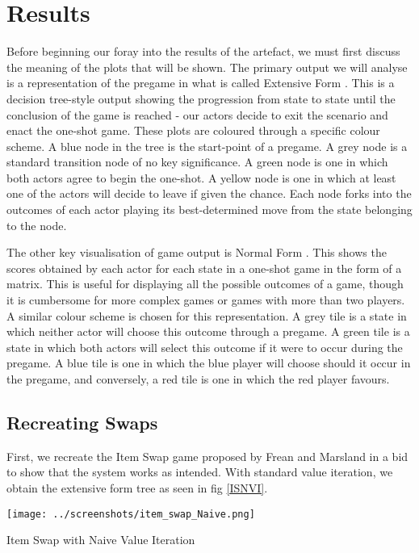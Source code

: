 \chapter{Results}\label{C:res}

Before beginning our foray into the results of the artefact, we must first discuss the meaning of the plots that will be shown. The primary output we will analyse is a representation of the pregame in what is called Extensive Form \cite{fudenberg1991game}. This is a decision tree-style output showing the progression from state to state until the conclusion of the game is reached - our actors decide to exit the scenario and enact the one-shot game. These plots are coloured through a specific colour scheme. A blue node in the tree is the start-point of a pregame. A grey node is a standard transition node of no key significance. A green node is one in which both actors agree to begin the one-shot. A yellow node is one in which at least one of the actors will decide to leave if given the chance. Each node forks into the outcomes of each actor playing its best-determined move from the state belonging to the node.

The other key visualisation of game output is Normal Form \cite{fudenberg1991game}. This shows the scores obtained by each actor for each state in a one-shot game in the form of a matrix. This is useful for displaying all the possible outcomes of a game, though it is cumbersome for more complex games or games with more than two players. A similar colour scheme is chosen for this representation. A grey tile is a state in which neither actor will choose this outcome through a pregame. A green tile is a state in which both actors will select this outcome if it were to occur during the pregame. A blue tile is one in which the blue player will choose should it occur in the pregame, and conversely, a red tile is one in which the red player favours.

\section{Recreating Swaps}

First, we recreate the Item Swap game proposed by Frean and Marsland \cite{frean2022holds} in a bid to show that the system works as intended. With standard value iteration, we obtain the extensive form tree as seen in fig \ref{ISNVI}.

\begin{fig}[H]
  \begin{minipage}[b]{1.0\linewidth}
    \centering
    \centerline{\texttt{[image: ../screenshots/item\_swap\_Naive.png]}}
    \caption{Item Swap with Naive Value Iteration}\medskip\label{ISNVI}
  \end{minipage}
\end{fig}

